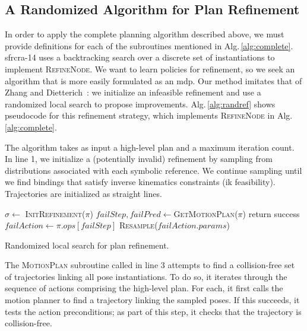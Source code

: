 \subsection{A Randomized Algorithm for Plan Refinement}
In order to apply the complete planning algorithm described above, we
must provide definitions for each of the subroutines mentioned in
Alg.\,\ref{alg:complete}. {\sc sfrcra-14} uses a backtracking search
over a discrete set of instantiations to implement
\textsc{RefineNode}. We want to learn policies for refinement, so we
seek an algorithm that is more easily formulated as an {\sc mdp}. Our
method imitates that of Zhang and Dietterich~\cite{JobShopSched}: we
initialize an infeasible refinement and use a randomized local search
to propose improvements. Alg.\,\ref{alg:randref} shows pseudocode for
this refinement strategy, which implements \textsc{RefineNode} in
Alg.\,\ref{alg:complete}.

The algorithm takes as input a high-level plan and a maximum iteration
count.  In line 1, we initialize a (potentially invalid) refinement by
sampling from distributions associated with each symbolic
reference. We continue sampling until we find bindings that satisfy
inverse kinematics constraints ({\sc ik} feasibility). Trajectories
are initialized as straight lines.

\begin{algorithm}[t]
\begin{small}
  \SetAlgoLined
  \DontPrintSemicolon
   {
  \nl $\sigma \leftarrow$ \textsc{InitRefinement}($\pi$)\;
  \nl {} {
  \nl $failStep, failPred \leftarrow $\textsc{GetMotionPlan}($\pi$)\;
  \nl {} {
  \nl return success }
  \nl {} {
  \nl $failAction \leftarrow \pi.ops[failStep]$\;
  \nl \textsc{Resample}($failAction.params$) }
  \nl {} }}

\end{small}
\caption{Randomized local search for plan refinement.}
\label{alg:randref}
\end{algorithm}

The \textsc{MotionPlan} subroutine called in line 3 attempts to
find a collision-free set of trajectories linking all pose instantiations.
To do so, it iterates through the sequence of actions comprising the high-level plan.
For each, it first calls the motion planner to find a trajectory
linking the sampled poses. If this succeeds, it tests the action preconditions;
as part of this step, it checks that the trajectory is collision-free.

